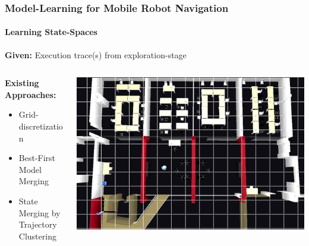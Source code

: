 
\begin{frame}
\frametitle{Model-Learning for Mobile Robot Navigation}
\framesubtitle{Learning State-Spaces}
\textbf{Given:} Execution trace(s) from exploration-stage 
\begin{columns}[T]
\begin{column}{0.4\textwidth}
	\vspace{12pt}
	\textbf{Existing Approaches:}
	\begin{itemize}
		\item \textcolor<2->{tudblue}{Grid-discretization}
		\item Best-First Model Merging
		\item State Merging by Trajectory Clustering
	\end{itemize}
	\pause
	\vspace{18pt}
	\small
\end{column}

\begin{column}{0.525\textwidth}
	\includegraphics[width=\textwidth]{figures/simulator_topview_grid2}
\end{column}
\end{columns}

\end{frame}

